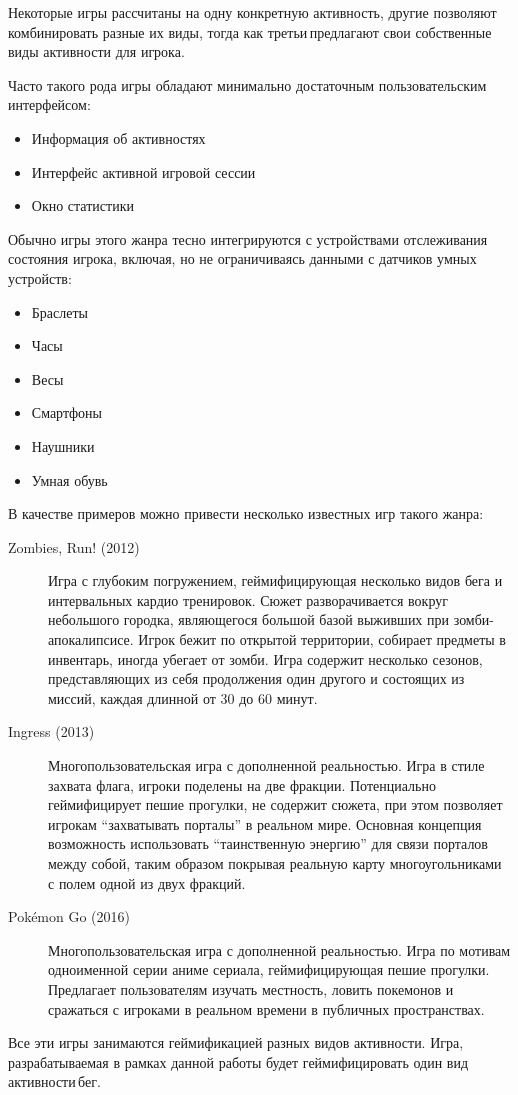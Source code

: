 Некоторые игры рассчитаны на одну конкретную активность, другие \textendash\space позволяют комбинировать разные их виды, тогда как третьи\,\textendash\space предлагают свои собственные виды активности для игрока.


Часто такого рода игры обладают минимально достаточным пользовательским интерфейсом:
\begin{itemize}
	\item Информация об активностях
	\item Интерфейс активной игровой сессии
	\item Окно статистики
\end{itemize}
\smallskip
Обычно игры этого жанра тесно интегрируются с устройствами отслеживания состояния игрока, включая, но не ограничиваясь данными с датчиков умных устройств:
\begin{itemize}
	\item Браслеты
	\item Часы
	\item Весы
	\item Смартфоны
	\item Наушники
	\item Умная обувь
\end{itemize}
\smallskip


В качестве примеров можно привести несколько известных игр такого жанра: 
\begin{description}
	\item[Zombies, Run! (2012)~\autocite{zombies}] Игра с глубоким погружением, геймифицирующая несколько видов бега и интервальных кардио тренировок. Сюжет разворачивается вокруг небольшого городка, являющегося большой базой выживших при зомби-апокалипсисе. Игрок бежит по открытой территории, собирает предметы в инвентарь, иногда убегает от зомби. Игра содержит несколько сезонов, представляющих из себя продолжения один другого и состоящих из миссий, каждая длинной от 30 до 60 минут.
	\item[Ingress (2013)~\autocite{ingress}] Многопользовательская игра с дополненной реальностью. Игра в стиле захвата флага, игроки поделены на две фракции. Потенциально геймифицирует пешие прогулки, не содержит сюжета, при этом позволяет игрокам ``захватывать порталы'' в реальном мире. Основная концепция \textendash\space возможность использовать ``таинственную энергию'' для связи порталов между собой, таким образом покрывая реальную карту многоугольниками с полем одной из двух фракций.
	\item[Pokémon Go (2016)~\autocite{pokemon_go}] Многопользовательская игра с дополненной реальностью. Игра по мотивам одноименной серии аниме сериала, геймифицирующая пешие прогулки. Предлагает пользователям изучать местность, ловить покемонов и сражаться с игроками в реальном времени в публичных пространствах.
\end{description}
\smallskip
Все эти игры занимаются геймификацией разных видов активности. Игра, разрабатываемая в рамках данной работы будет геймифицировать один вид активности\,\textendash\space бег. 
